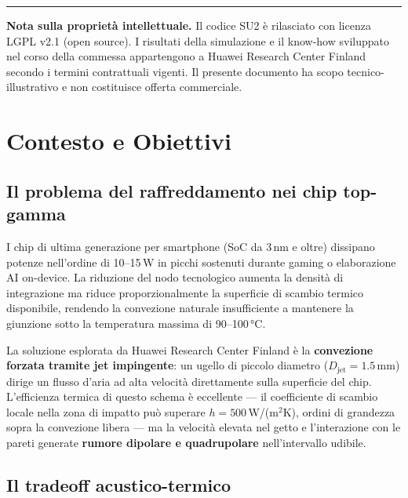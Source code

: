 \documentclass[11pt,a4paper]{article}
\newcommand{\Djet}{D_{\mathrm{jet}}}
\begin{document}
\vspace{0.4cm}
\hrule
\vspace{0.4cm}
{\small
\textbf{Nota sulla proprietà intellettuale.} Il codice SU2 è rilasciato con licenza LGPL v2.1 (open source). I risultati della simulazione e il know-how sviluppato nel corso della commessa appartengono a Huawei Research Center Finland secondo i termini contrattuali vigenti. Il presente documento ha scopo tecnico-illustrativo e non costituisce offerta commerciale.
}

\newpage
\tableofcontents
\newpage

\section{Contesto e Obiettivi}
\label{sec:contesto}

\subsection{Il problema del raffreddamento nei chip top-gamma}

I chip di ultima generazione per smartphone (SoC da 3\,nm e oltre) dissipano potenze nell'ordine di 10--15\,W in picchi sostenuti durante gaming o elaborazione AI on-device. La riduzione del nodo tecnologico aumenta la densità di integrazione ma riduce proporzionalmente la superficie di scambio termico disponibile, rendendo la convezione naturale insufficiente a mantenere la giunzione sotto la temperatura massima di 90--100\,°C.

La soluzione esplorata da Huawei Research Center Finland è la \textbf{convezione forzata tramite jet impingente}: un ugello di piccolo diametro ($\Djet = 1.5$\,mm) dirige un flusso d'aria ad alta velocità direttamente sulla superficie del chip. L'efficienza termica di questo schema è eccellente --- il coefficiente di scambio locale nella zona di impatto può superare $h = 500$\,W/(m$^2$K), ordini di grandezza sopra la convezione libera --- ma la velocità elevata nel getto e l'interazione con le pareti generate \textbf{rumore dipolare e quadrupolare} nell'intervallo udibile.

\subsection{Il tradeoff acustico-termico}
\end{document}
